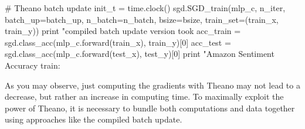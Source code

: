 \begin{exercise}
\begin{python}
# Theano batch update
init_t = time.clock()
sgd.SGD_train(mlp_c, n_iter, batch_up=batch_up, n_batch=n_batch, bsize=bsize, 
              train_set=(train_x, train_y))
print "\nTheano compiled batch update version took %
acc_train = sgd.class_acc(mlp_c.forward(train_x), train_y)[0]
acc_test  = sgd.class_acc(mlp_c.forward(test_x), test_y)[0]
print "Amazon Sentiment Accuracy train: %
\end{python}
As you may observe, just computing the gradients with Theano may not lead to
a decrease, but rather an increase in computing time. To maximally exploit
the power of Theano, it is necessary to bundle both computations and data 
together using approaches like the compiled batch update.
\end{exercise}
